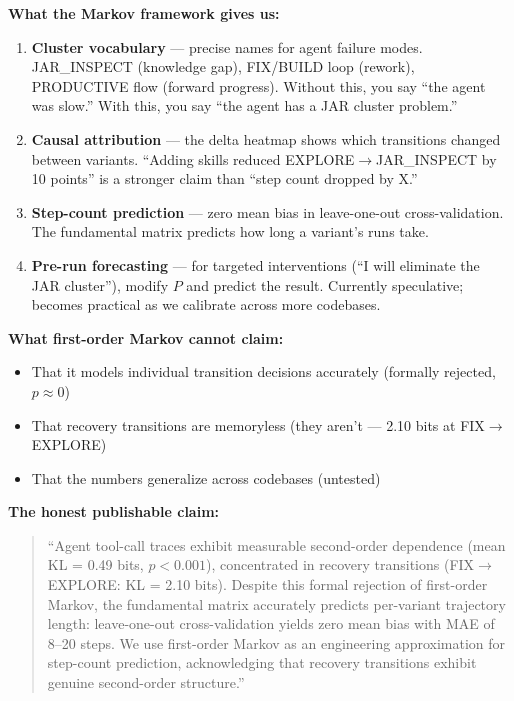 \documentclass[11pt,a4paper]{article}
\begin{document}
\begin{findingbox}
\textbf{What the Markov framework gives us:}

\begin{enumerate}[leftmargin=1.5em]
  \item \textbf{Cluster vocabulary} --- precise names for agent failure modes.
    JAR\_INSPECT (knowledge gap), FIX/BUILD loop (rework), PRODUCTIVE flow (forward progress).
    Without this, you say ``the agent was slow.''
    With this, you say ``the agent has a JAR cluster problem.''

  \item \textbf{Causal attribution} --- the delta heatmap shows which transitions
    changed between variants. ``Adding skills reduced EXPLORE$\to$JAR\_INSPECT by 10 points''
    is a stronger claim than ``step count dropped by X.''

  \item \textbf{Step-count prediction} --- zero mean bias in leave-one-out cross-validation.
    The fundamental matrix predicts how long a variant's runs take.

  \item \textbf{Pre-run forecasting} --- for targeted interventions
    (``I will eliminate the JAR cluster''), modify $P$ and predict the result.
    Currently speculative; becomes practical as we calibrate across more codebases.
\end{enumerate}

\vspace{6pt}
\textbf{What first-order Markov cannot claim:}
\vspace{4pt}
\begin{itemize}[leftmargin=1.5em]
  \item That it models individual transition decisions accurately (formally rejected, $p \approx 0$)
  \item That recovery transitions are memoryless (they aren't --- 2.10 bits at FIX$\to$EXPLORE)
  \item That the numbers generalize across codebases (untested)
\end{itemize}

\vspace{6pt}
\textbf{The honest publishable claim:}
\vspace{4pt}
\begin{quote}
``Agent tool-call traces exhibit measurable second-order dependence
(mean KL = 0.49 bits, $p < 0.001$), concentrated in recovery transitions
(FIX$\to$EXPLORE: KL = 2.10 bits). Despite this formal rejection of first-order Markov,
the fundamental matrix accurately predicts per-variant trajectory length:
leave-one-out cross-validation yields zero mean bias with MAE of 8--20 steps.
We use first-order Markov as an engineering approximation for step-count prediction,
acknowledging that recovery transitions exhibit genuine second-order structure.''
\end{quote}
\end{findingbox}
\end{document}

